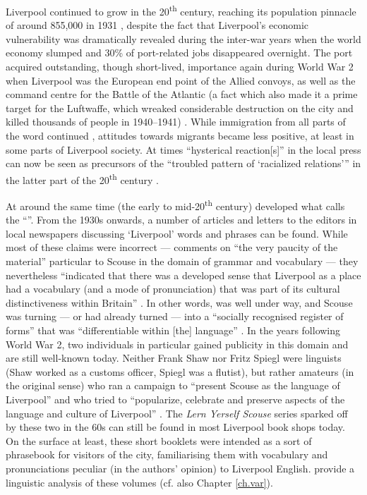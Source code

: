 Liverpool continued to grow in the 20\textsuperscript{th} century, reaching its population pinnacle of around 855,000 in 1931 \citep[cf.][171]{pooley2006}, despite the fact that Liverpool's economic vulnerability was dramatically revealed during the inter-war years when the world economy slumped and 30\% of port-related jobs disappeared overnight.
The port acquired outstanding, though short-lived, importance again during World War 2 when Liverpool was the European end point of the Allied convoys, as well as the command centre for the Battle of the Atlantic (a fact which also made it a prime target for the Luftwaffe, which wreaked considerable destruction on the city and killed thousands of people in 1940--1941) \citep[cf.][393 and 405]{murden2006}.
While immigration from all parts of the word continued \citep[cf.][119]{honeybone2007}, attitudes towards migrants became less positive, at least in some parts of Liverpool society.
At times ``hysterical reaction[s]'' in the local press can now be seen as precursors of the ``troubled pattern of `racialized relations''' in the latter part of the 20\textsuperscript{th} century \citep[cf.][23]{belchem2006a}.

At around the same time (the early to mid-20\textsuperscript{th} century) developed what \citet[40]{crowley2012} calls the ``''.
From the 1930s onwards, a number of articles and letters to the editors in local newspapers discussing `Liverpool' words and phrases can be found.
While most of these claims were incorrect --- \citet[48]{knowles1973} comments on ``the very paucity of the material'' particular to Scouse in the domain of grammar and vocabulary --- they nevertheless ``indicated that there was a developed sense that Liverpool as a place had a vocabulary (and a mode of pronunciation) that was part of its cultural distinctiveness within Britain'' \parencite[42]{crowley2012}.
In other words, \emph{} was well under way, and Scouse was turning --- or had already turned --- into a ``socially recognised register of forms'' that was ``differentiable within [the] language'' \parencite[231]{agha2003}.
In the years following World War 2, two individuals in particular gained publicity in this domain and are still well-known today.
Neither Frank Shaw nor Fritz Spiegl were linguists (Shaw worked as a customs officer, Spiegl was a flutist), but rather amateurs (in the original sense) who ran a campaign to ``present Scouse as the language of Liverpool'' and who tried to ``popularize, celebrate and preserve aspects of the language and culture of Liverpool'' \citep[64--65]{crowley2012}.
The \emph{Lern Yerself Scouse} series sparked off by these two in the 60s can still be found in most Liverpool book shops today.
On the surface at least, these short booklets were intended as a sort of phrasebook for visitors of the city, familiarising them with vocabulary and pronunciations peculiar (in the authors' opinion) to Liverpool English. \citet{honeybonewatson2013} provide a linguistic analysis of these volumes (cf. also Chapter \ref{ch.var}).

